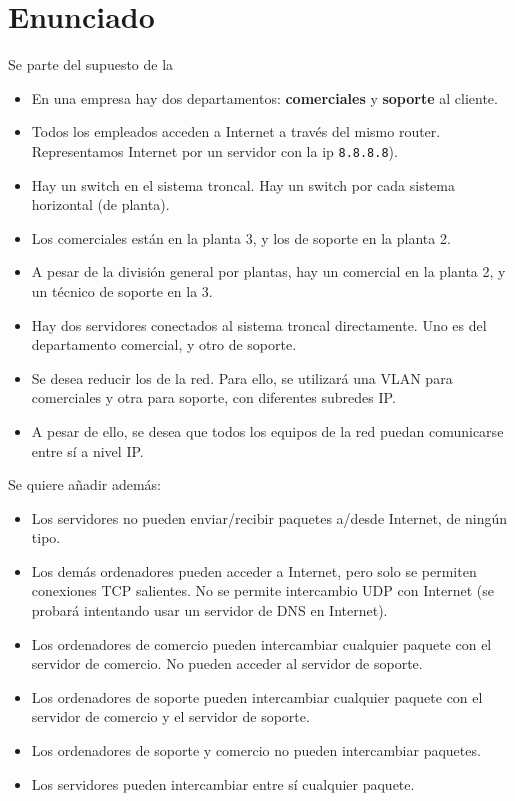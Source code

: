 \section{Enunciado}
Se parte del supuesto de la 
\begin{itemize}
\item En una empresa hay dos departamentos: \textbf{comerciales} y \textbf{soporte} al cliente.
\item Todos los empleados acceden a Internet a través del mismo router. Representamos Internet por un servidor con la ip \texttt{8.8.8.8}).
\item Hay un switch en el sistema troncal. Hay un switch por cada sistema horizontal (de planta).  
\item Los comerciales están en la planta 3, y los de soporte en la planta 2.
\item A pesar de la división general por plantas, hay un comercial en la planta 2, y un técnico de soporte en la 3.
\item Hay dos servidores conectados al sistema troncal directamente. Uno es del departamento comercial, y otro de soporte.
\item Se desea reducir los  de la red. Para ello, se utilizará una VLAN para comerciales y otra para soporte, con diferentes subredes IP.
\item A pesar de ello, se desea que todos los equipos de la red puedan comunicarse entre sí a nivel IP.
\end{itemize}

Se quiere añadir además:
\begin{itemize}
\item Los servidores no pueden enviar/recibir paquetes a/desde Internet, de ningún tipo.
\item Los demás ordenadores pueden acceder a Internet, pero solo se permiten conexiones TCP salientes. No se permite intercambio UDP con Internet (se probará intentando usar un servidor de DNS en Internet).
\item Los ordenadores de comercio pueden intercambiar cualquier paquete con el servidor de comercio. No pueden acceder al servidor de soporte.
\item Los ordenadores de soporte pueden intercambiar cualquier paquete con el servidor de comercio y el servidor de soporte.
\item Los ordenadores de soporte y comercio no pueden intercambiar paquetes.
\item Los servidores pueden intercambiar entre sí cualquier paquete.
\end{itemize}


